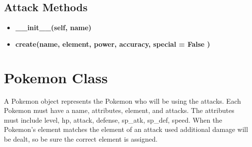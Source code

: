 \documentclass{article}
\begin{document}
        \subsection{Attack Methods}
        \begin{itemize}
            \item \textbf{\_\_init\_\_(self, name)}\\
            \item \textbf{create(name, element, power, accuracy, special = False )}\\
        \end{itemize}
        \section{Pokemon Class}
        A Pokemon object represents the Pokemon who will be using the attacks. Each Pokemon must have a name, attributes, element, and attacks. The attributes must include level, hp, attack, defense, sp\_atk, sp\_def, speed. When the Pokemon's element matches the element of an attack used additional damage will be dealt, so be sure the correct element is assigned.
\end{document}
